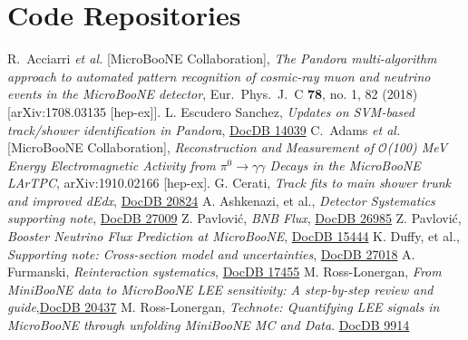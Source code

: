 \documentclass[a4paper]{article}
\begin{document}
\section{Code Repositories}

\begin{thebibliography}{}
  R.~Acciarri {\it et al.} [MicroBooNE Collaboration],
  \emph{The Pandora multi-algorithm approach to automated pattern recognition of cosmic-ray muon and neutrino events in the MicroBooNE detector}, Eur.\ Phys.\ J.\ C {\bf 78}, no. 1, 82 (2018) [arXiv:1708.03135 [hep-ex]].
L. Escudero Sanchez, \emph{Updates on SVM-based track/shower identification in Pandora},
\href{https://microboone-docdb.fnal.gov/cgi-bin/private/ShowDocument?docid=14039}{DocDB 14039}
  C.~Adams {\it et al.} [MicroBooNE Collaboration],
  \emph{Reconstruction and Measurement of $\mathcal{O}$(100) MeV Energy Electromagnetic Activity from $\pi^0 \rightarrow \gamma\gamma$ Decays in the MicroBooNE LArTPC},  arXiv:1910.02166 [hep-ex].
G. Cerati, \emph{Track fits to main shower trunk and improved dEdx}, \href{https://microboone-docdb.fnal.gov/cgi-bin/private/ShowDocument?docid=20824}{DocDB 20824}
A. Ashkenazi, et al., \emph{Detector Systematics supporting note}, \href{https://microboone-docdb.fnal.gov/cgi-bin/private/ShowDocument?docid=27009}{DocDB 27009}
Z. Pavlović, \emph{BNB Flux}, \href{https://microboone-docdb.fnal.gov/cgi-bin/private/RetrieveFile?docid=26985}{DocDB 26985}
Z. Pavlović, \emph{Booster Neutrino Flux Prediction at MicroBooNE}, \href{https://microboone-docdb.fnal.gov/cgi-bin/private/RetrieveFile?docid=15444}{DocDB 15444}
K. Duffy, et al., \emph{Supporting note: Cross-section model and uncertainties}, \href{https://microboone-docdb.fnal.gov/cgi-bin/private/ShowDocument?docid=27018}{DocDB 27018}
A. Furmanski, \emph{Reinteraction systematics}, \href{https://microboone-docdb.fnal.gov/cgi-bin/private/ShowDocument?docid=17455}{DocDB 17455}
M. Ross-Lonergan, \emph{From MiniBooNE data to MicroBooNE LEE sensitivity: A step-by-step review and guide},\href{https://microboone-docdb.fnal.gov/cgi-bin/private/RetrieveFile?docid=20437}{DocDB 20437}
 M. Ross-Lonergan, \emph{Technote: Quantifying LEE signals in MicroBooNE through unfolding MiniBooNE MC and Data}. \href{https://microboone-docdb.fnal.gov/cgi-bin/private/ShowDocument?docid=9914}{DocDB 9914}


\end{thebibliography}
\end{document}
